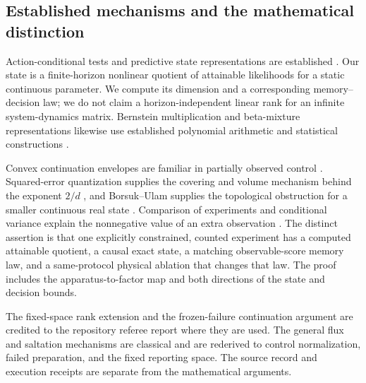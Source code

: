 \subsection{Established mechanisms and the mathematical distinction}
Action-conditional tests and predictive state representations are established
\cite{LittmanSutton,SinghJamesRudary}. Our state is a finite-horizon nonlinear
quotient of attainable likelihoods for a static continuous parameter. We
compute its dimension and a corresponding memory--decision law; we do not
claim a horizon-independent linear rank for an infinite system-dynamics
matrix. Bernstein multiplication and beta-mixture representations likewise
use established polynomial arithmetic and statistical constructions
\cite{FaroukiRajan,PetroneWasserman}.

Convex continuation envelopes are familiar in partially observed control
\cite{SmallwoodSondik,FeinbergEtAl}. Squared-error quantization supplies the
covering and volume mechanism behind the exponent $2/d$ \cite{GrafLuschgy},
and Borsuk--Ulam supplies the topological obstruction for a smaller
continuous real state \cite{Matousek}. Comparison of experiments and
conditional variance explain the nonnegative value of an extra observation
\cite{Blackwell}. The distinct assertion is that one explicitly constrained,
counted experiment has a computed attainable quotient, a causal exact
state, a matching observable-score memory law, and a same-protocol physical
ablation that changes that law. The proof includes the apparatus-to-factor
map and both directions of the state and decision bounds.

The fixed-space rank extension and the frozen-failure continuation
argument are credited to the repository referee report \cite{RefereeV4}
where they are used. The general flux and saltation mechanisms are classical
\cite{Golse,Chernov,KongEtAl} and are rederived to control normalization,
failed preparation, and the fixed reporting space. The source record and
execution receipts are separate from the mathematical arguments.
